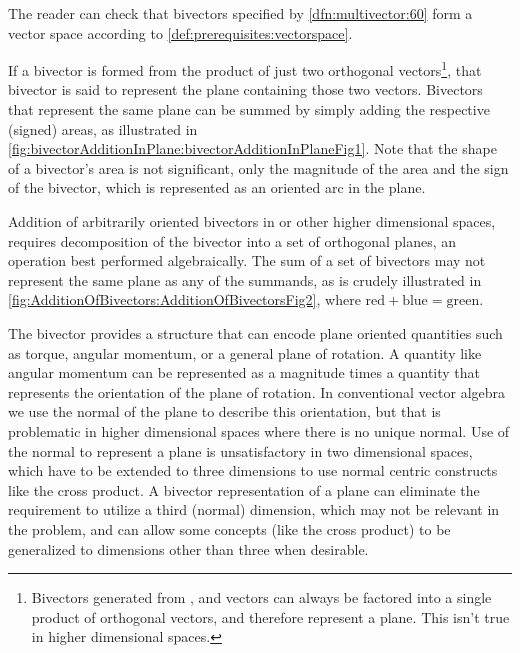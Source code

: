 The reader can check that bivectors specified by \cref{dfn:multivector:60} form a vector space according to \cref{def:prerequisites:vectorspace}.

If a bivector is formed from the product of just two orthogonal vectors\footnote{Bivectors generated from , and  vectors can always be factored into a single product of orthogonal vectors, and therefore represent a plane.  This isn't true in higher dimensional spaces.}, that bivector is said to represent the plane containing those two vectors.
Bivectors that represent the same plane can be summed by simply adding the respective (signed) areas, as illustrated in
\cref{fig:bivectorAdditionInPlane:bivectorAdditionInPlaneFig1}.
Note that the shape of a bivector's area is not significant, only the magnitude of the area and the sign of the bivector, which is represented as an oriented arc in the plane.

Addition of arbitrarily oriented bivectors in  or other higher dimensional spaces, requires decomposition of the bivector into a set of orthogonal planes, an operation best performed algebraically.  The sum of a set of bivectors may not represent the same plane as any of the summands, as is crudely illustrated in
\cref{fig:AdditionOfBivectors:AdditionOfBivectorsFig2}, where \( \text{red} + \text{blue} = \text{green} \).

The bivector provides a structure that can encode plane oriented quantities such as torque, angular momentum, or a general plane of rotation.
A quantity like angular momentum can be represented as a magnitude times a quantity that represents the orientation of the plane of rotation.
In conventional vector algebra we use the normal of the plane to describe this orientation, but that is problematic in higher dimensional spaces where there is no unique normal.
Use of the normal to represent a plane is unsatisfactory in two dimensional spaces, which have to be extended to three dimensions to use normal centric constructs like the cross product.
A bivector representation of a plane can eliminate the requirement to utilize a third (normal) dimension, which may not be relevant in the problem, and can allow some concepts (like the cross product) to be generalized to dimensions other than three when desirable.


